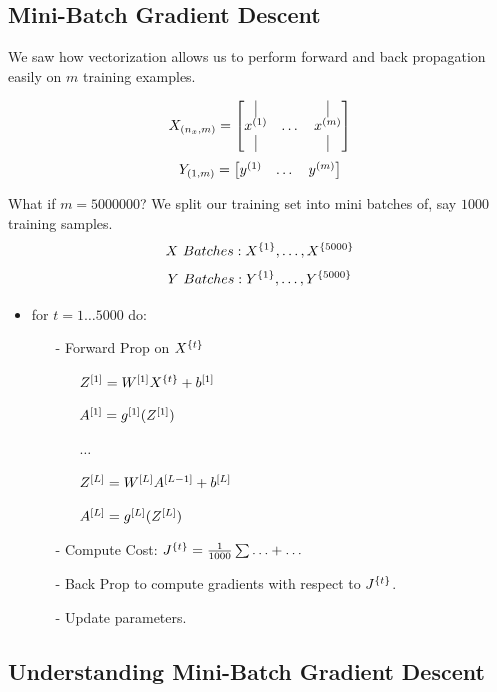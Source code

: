 \subsection{Mini-Batch Gradient Descent}
We saw how vectorization allows us to perform forward and back propagation easily on $m$ training examples. 

$$
X_{(n_x, m)} = \begin{bmatrix}
    \vline &  & \vline\\
    x\idx{1} & \dots & x\idx{m}\\
    \vline &  & \vline
\end{bmatrix}
$$
$$
Y_{(1, m)} = 
\begin{bmatrix}
    y^{(1)} & \dots & y^{(m)}
\end{bmatrix} 
$$

What if $m=5000000$? We split our training set into mini batches of, say $1000$ training samples.
$$
X\ Batches: X^{\{1\}}, \dots, X^{\{5000\}}
$$ 
$$
Y\ Batches: Y^{\{1\}}, \dots, Y^{\{5000\}}
$$

\begin{itemize}
    \item for $t=1\dots5000$ do:
    \begin{itemize}
        \item[-] Forward Prop on $X^{\{t\}}$
        \begin{itemize}
            \item[] $Z^{[1]} = W^{[1]}X^{\{t\}}+b^{[1]}$
            \item[] $A^{[1]} = g^{[1]}(Z^{[1]})$ 
            \item[] $\dots$
            \item[] $Z^{[L]} = W^{[L]}A^{[L-1]}+b^{[L]}$
            \item[] $A^{[L]} = g^{[L]}(Z^{[L]})$ 
        \end{itemize} 
        \item[-] Compute Cost: $J^{\{t\}}=\frac{1}{1000}\sum{\dots} + \dots$
        \item[-] Back Prop to compute gradients with respect to $J^{\{t\}}$. 
        \item[-] Update parameters.   
    \end{itemize}
\end{itemize}

\subsection{Understanding Mini-Batch Gradient Descent}

